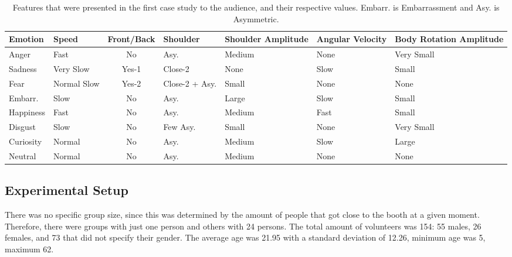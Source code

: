 \begin{table}[tbh]
\begin{center}
\small
\caption{Features that were presented in the first case study to the audience, and their respective values. Embarr. is Embarrassment and Asy. is Asymmetric.}
\label{table:features}
\begin{tabular}{|p{1.5 cm}|p{1.5 cm}|c|p{1.5 cm}|p{1.6 cm}|p{1.6 cm}|m{1.5 cm}|}
\hline 
\textbf{Emotion} & \textbf{Speed} & \textbf{Front/Back} & \textbf{Shoulder} & \textbf{Shoulder Amplitude} & \textbf{Angular Velocity} & \textbf{Body Rotation Amplitude} \\ 
\hline
Anger & Fast & No & Asy. & Medium & None & Very Small \\
\hline
Sadness & Very Slow & Yes-1 & Close-2 & None & Slow & Small \\
\hline
Fear & Normal Slow & Yes-2 & Close-2 + Asy. & Small & None & None \\ 
\hline
Embarr. & Slow & No & Asy. & Large & Slow & Small \\
\hline
Happiness & Fast & No & Asy. & Medium & Fast & Small \\
\hline
Disgust & Slow & No & Few Asy. & Small & None & Very Small \\
\hline
Curiosity & Normal & No & Asy. & Medium & Slow & Large \\
\hline
Neutral & Normal & No & Asy. & Medium & None & None \\
\hline
\end{tabular}
\end{center}
\vspace{-0.5cm}
\end{table} 

\subsection{Experimental Setup}

There was no specific group size, since this was determined by the amount of people that got close to the booth at a given moment. Therefore, there were groups with just one person and others with 24 persons. The total amount of volunteers was 154: 55 males, 26 females, and 73 that did not specify their gender. The average age was 21.95 with a standard deviation of 12.26, minimum age was 5, maximum 62.

